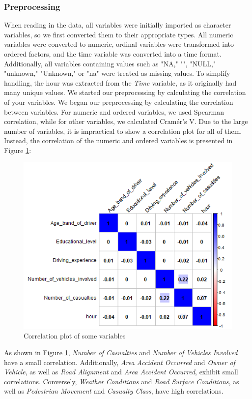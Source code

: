 \documentclass{article}
\begin{document}
\subsubsection{Preprocessing}
When reading in the data, all variables were initially imported as character variables, so we first converted them to their appropriate types. All numeric variables were converted to numeric, ordinal variables were transformed into ordered factors, and the time variable was converted into a time format. Additionally, all variables containing values such as "NA," "", "NULL," "unknown," "Unknown," or "na" were treated as missing values. To simplify handling, the hour was extracted from the \textit{Time} variable, as it originally had many unique values.
We started our preprocessing by calculating the correlation of your variables.\newline
We began our preprocessing by calculating the correlation between variables. For numeric and ordered variables, we used Spearman correlation, while for other variables, we calculated Cramér's V. Due to the large number of variables, it is impractical to show a correlation plot for all of them. Instead, the correlation of the numeric and ordered variables is presented in Figure \ref{fig:cor_RTA}:
\begin{figure}[H]
\centering
\includegraphics[width=0.8\linewidth]{plots_correlation_num_RTA.png}
\caption{\label{fig:cor_RTA} Correlation plot of some variables}
\end{figure}
As shown in Figure \ref{fig:cor_RTA}, \textit{Number of Casualties} and \textit{Number of Vehicles Involved} have a small correlation. Additionally, \textit{Area Accident Occurred} and \textit{Owner of Vehicle}, as well as \textit{Road Alignment} and \textit{Area Accident Occurred}, exhibit small correlations. Conversely, \textit{Weather Conditions} and \textit{Road Surface Conditions}, as well as \textit{Pedestrian Movement} and \textit{Casualty Class}, have high correlations.
\end{document}

